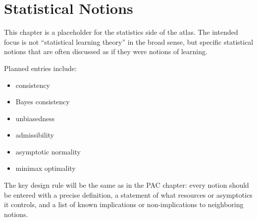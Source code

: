 \chapter{Statistical Notions}

This chapter is a placeholder for the statistics side of the atlas. The intended focus is not ``statistical learning theory'' in the broad sense, but specific statistical notions that are often discussed as if they were notions of learning.

Planned entries include:

\begin{itemize}
\item consistency
\item Bayes consistency
\item unbiasedness
\item admissibility
\item asymptotic normality
\item minimax optimality
\end{itemize}

The key design rule will be the same as in the PAC chapter: every notion should be entered with a precise definition, a statement of what resources or asymptotics it controls, and a list of known implications or non-implications to neighboring notions.
